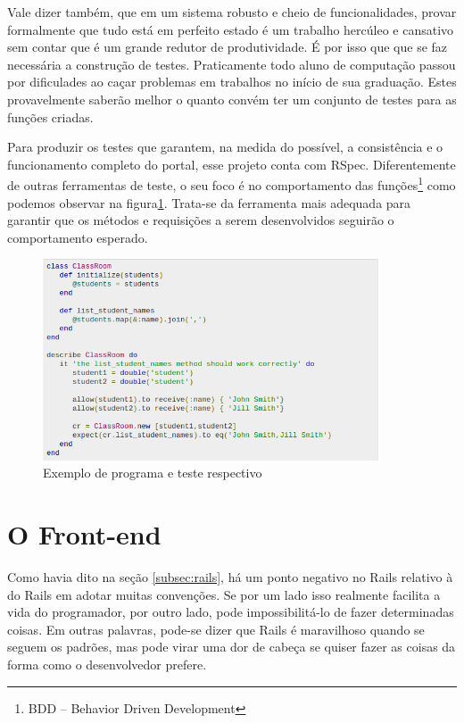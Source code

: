 Vale dizer também, que em um sistema robusto e cheio de funcionalidades, provar
formalmente que tudo está em perfeito estado é um trabalho hercúleo e cansativo
sem contar que é um grande redutor de produtividade. É por isso que que se faz
necessária a construção de testes. Praticamente todo aluno de computação passou
por dificulades ao caçar problemas em trabalhos no início de sua graduação.
Estes provavelmente saberão melhor o quanto convém ter um conjunto de testes
para as funções criadas.

Para produzir os testes que garantem, na medida do possível, a consistência e o
funcionamento completo do portal, esse projeto conta com RSpec. Diferentemente de
outras ferramentas de teste, o seu foco é no comportamento das funções\footnote{
BDD -- Behavior Driven Development} como podemos observar na figura\ref{fig:rspec}.
Trata-se da ferramenta mais adequada para garantir que os métodos e requisições a
serem desenvolvidos seguirão o comportamento esperado.

\begin{figure}[htb]
\includegraphics[width=10cm]{figuras/rspec}
\caption{\label{fig:rspec} Exemplo de programa e teste respectivo}
\end{figure}

\section{O Front-end}
\label{sec:front-end}

Como havia dito na seção \ref{subsec:rails}, há um ponto negativo no Rails relativo à
 do Rails em adotar muitas convenções. Se por um lado isso realmente facilita
a vida do programador, por outro lado, pode impossibilitá-lo de fazer determinadas coisas.
Em outras palavras, pode-se dizer que Rails é maravilhoso quando se seguem os padrões, mas
pode virar uma dor de cabeça se quiser fazer as coisas da forma como o desenvolvedor
prefere.

